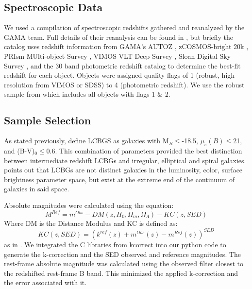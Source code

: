 \documentclass[manuscript]{aastex61}
\begin{document}
\subsection{Spectroscopic Data}
We used a compilation of spectroscopic redshifts gathered and reanalyzed by the GAMA team. Full details of their reanalysis can be found in \citet{2015MNRAS.447.1014D}, but briefly the catalog uses redshift information from GAMA's AUTOZ \citep{2014MNRAS.441.2440B}, zCOSMOS-bright 20k \citep{2009ApJS..184..218L}, PRIsm MUlti-object Survey \citep{2011ApJ...741....8C,2011ApJ...741....8C}, VIMOS VLT Deep Survey \citep{2008A&A...486..683G}, Sloan Digital Sky Survey \citep{2014ApJS..211...17A}, and the 30 band photometric redshift catalog \citep{2009ApJ...690.1236I} to determine the best-fit redshift for each object. Objects were assigned quality flags of 1 (robust, high resolution from VIMOS or SDSS) to 4 (photometric redshift). We use the robust sample from \citet{2015MNRAS.447.1014D} which includes all objects with flags 1 \& 2.

\subsection{Sample Selection}
As stated previously, \citet{2004ApJ...617.1004W} define LCBGS as galaxies with M$_{B}\leq$-18.5, $\mu_{e}(B)\leq$21, and (B-V)$_{0}\leq$0.6. This combination of parameters provided the best distinction between intermediate redshift LCBGs and irregular, elliptical and spiral galaxies. \citet{2004ApJ...617.1004W} points out that LCBGs are not distinct galaxies in  the luminosity, color, surface brightness parameter space, but exist at the extreme end of the continuum of galaxies in said space. 

Absolute magnitudes were calculated using the equation:
\begin{equation}
M^{Ref}=m^{Obs}-DM(z,H_{0},\Omega_{m},\Omega_{\Lambda})-KC(z,SED)
\label{eq:equation 1}
\end{equation}
Where DM is the Distance Modulus and KC is defined as:
\begin{equation}
KC(z,SED)=(k^{ref}(z)+m^{Obs}(z)-m^{Ref}(z))^{SED}
\label{eq:equation 2}
\end{equation}
as in \citet{2005A&A...439..863I}. We integrated the C libraries from kcorrect \citep{2007AJ....133..734B} into our python code to generate the k-correction and the SED observed and reference magnitudes. The rest-frame absolute magnitude was calculated using the observed filter closest to the redshifted rest-frame B band. This minimized the applied k-correction and the error associated with it.
\end{document}
